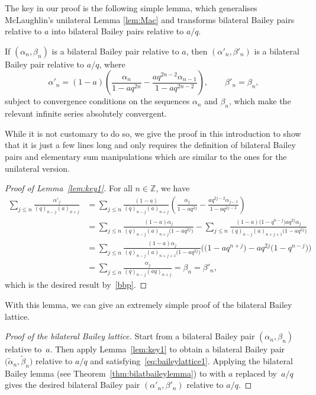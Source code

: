The key in our proof is the following simple lemma, which generalises McLaughlin's unilateral Lemma \ref{lem:Mac} and transforms bilateral Bailey pairs relative to $a$ into bilateral Bailey pairs relative to $a/q$.
\begin{Lemma}\label{lem:key1}
If $(\alpha_n, \beta_n)$ is a bilateral Bailey pair relative to $a$, then $(\alpha'_n, \beta'_n)$ is a bilateral Bailey pair relative to $a/q$, where
\begin{equation}\label{eq:baileylattice1}
\alpha'_n=(1-a)\left(\frac{\alpha_n}{1-aq^{2n}}-\frac{aq^{2n-2}\alpha_{n-1}}{1-aq^{2n-2}}\right), \qquad \beta'_n=\beta_n,
\end{equation}
subject to convergence conditions on the sequences $\alpha_n$ and $\beta_n$, which make the relevant infinite series absolutely convergent.
\end{Lemma}
While it is not customary to do so, we give the proof in this introduction to show that it is just a few lines long and only requires the definition of bilateral Bailey pairs and elementary sum manipulations which are similar to the ones for the unilateral version.
\begin{proof}[Proof of Lemma~\ref{lem:key1}]
For all $n\in\mathbb{Z}$, we have
\begin{align*}
\sum_{j\leq n} \frac{\alpha'_j}{(q)_{n-j}(a)_{n+j}}&= \sum_{j\leq n} \frac{(1-a)}{(q)_{n-j}(a)_{n+j}}\left(\frac{\alpha_j}{1-aq^{2j}}-\frac{aq^{2j-2}\alpha_{j-1}}{1-aq^{2j-2}}\right)\\
&= \sum_{j\leq n} \frac{(1-a)\alpha_j}{(q)_{n-j}(a)_{n+j}\bigl(1-aq^{2j}\bigr)}-\sum_{j\leq n} \frac{(1-a)\bigl(1-q^{n-j}\bigr)aq^{2j}\alpha_{j}}{(q)_{n-j}(a)_{n+j+1}\bigl(1-aq^{2j}\bigr)}\\
&=\sum_{j\leq n} \frac{(1-a)\alpha_j}{(q)_{n-j}(a)_{n+j+1}\bigl(1-aq^{2j}\bigr)}\bigl(\bigl(1-aq^{n+j}\bigr)-aq^{2j}\bigl(1-q^{n-j}\bigr)\bigr)\\
&=\sum_{j\leq n} \frac{\alpha_j}{(q)_{n-j}(aq)_{n+j}}=\beta_n=\beta'_n,
\end{align*}
which is the desired result by~\eqref{bbp}.
\end{proof}
With this lemma, we can give an extremely simple proof of the bilateral Bailey lattice.
\begin{proof}[Proof of the bilateral Bailey lattice]
Start from a bilateral Bailey pair $(\alpha_n, \beta_n)$ relative to~$a$. Then apply Lemma~\ref{lem:key1} to obtain a bilateral Bailey pair $\bigl(\tilde{\alpha}_n, \tilde{\beta}_n\bigr)$ relative to $a/q$ and satisfying~\eqref{eq:baileylattice1}. Applying the bilateral Bailey lemma (see Theorem~\ref{thm:bilatbaileylemma}) to  with $a$ replaced by~$a/q$ gives the desired bilateral Bailey pair $(\alpha'_n, \beta'_n)$ relative to $a/q$.
\end{proof}

